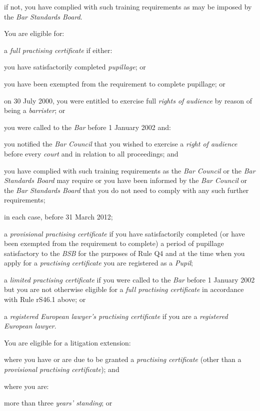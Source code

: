 \item if not, you have complied with such training requirements as may be
imposed by the \emph{Bar Standards Board}.\la
\ln
{}

You are eligible for:\nl\item a \emph{full practising certificate} if either:
\al
\item you have satisfactorily completed \emph{pupillage}; or

\item you have been exempted from the requirement to complete pupillage; or

\item on 30 July 2000, you were entitled to exercise full \emph{rights of
audience} by reason of being a \emph{barrister}; or

\item you were called to the \emph{Bar} before 1 January 2002 and:
\rl
\item you notified the \emph{Bar Council} that you wished to exercise a
\emph{right of audience} before every \emph{court} and in relation to
all proceedings; and

\item you have complied with such training requirements as the \emph{Bar
Council} or the \emph{Bar Standards Board} may require or you have been
informed by the \emph{Bar Council} or the \emph{Bar Standards Board}
that you do not need to comply with any such further requirements;\lr\la

in each case, before 31 March 2012;
\item a \emph{provisional practising certificate} if you have
satisfactorily completed (or have been exempted from the requirement to
complete) a period of pupillage satisfactory to the \emph{BSB} for the
purposes of Rule Q4 and at the time when you apply for a
\emph{practising certificate} you are registered as a \emph{Pupil};
\item a \emph{limited practising certificate} if you were called to the
\emph{Bar} before 1 January 2002 but you are not otherwise eligible for
a \emph{full practising certificate} in accordance with Rule rS46.1
above; or
\item a \emph{registered European lawyer's practising certificate} if you
are a \emph{registered European lawyer}.
\ln
{}

You are eligible for a litigation extension:\nl\item where you have or are due to be granted a \emph{practising
certificate} (other than a \emph{provisional practising certificate});
and
\item where you are:
\al
\item more than three \emph{years' standing}; or

